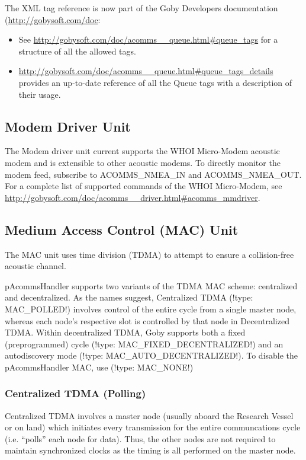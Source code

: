 The XML tag reference is now part of the Goby Developers documentation (\url{http://gobysoft.com/doc}:
\begin{itemize}
\item See \url{http://gobysoft.com/doc/acomms__queue.html#queue_tags} for a structure of all the allowed tags.
\item \url{http://gobysoft.com/doc/acomms__queue.html#queue_tags_details} provides an up-to-date reference of all the Queue tags with a description of their usage.
\end{itemize}  

\subsection{Modem Driver Unit}

The Modem driver unit current supports the WHOI Micro-Modem acoustic modem and is extensible to other acoustic modems. To directly monitor the modem feed, subscribe to ACOMMS\_NMEA\_IN and ACOMMS\_NMEA\_OUT. For a complete list of supported commands of the WHOI Micro-Modem, see \url{http://gobysoft.com/doc/acomms__driver.html#acomms_mmdriver}.

\subsection{Medium Access Control (MAC) Unit}

The MAC unit uses time division (TDMA) to attempt to ensure a collision-free acoustic channel.

pAcommsHandler supports two variants of the TDMA MAC scheme: centralized and decentralized. As the names suggest, Centralized TDMA (!type: MAC_POLLED!) involves control of the entire cycle from a single master node, whereas each node's respective slot is controlled by that node in Decentralized TDMA. Within decentralized TDMA, Goby supports both a fixed (preprogrammed) cycle (!type: MAC_FIXED_DECENTRALIZED!) and an autodiscovery mode (!type: MAC_AUTO_DECENTRALIZED!). To disable the pAcommsHandler MAC, use (!type: MAC_NONE!)

\subsubsection{Centralized TDMA (Polling)}

Centralized TDMA involves a master node (usually aboard the Research Vessel or on land) which initiates every transmission for the entire communcations cycle (i.e. ``polls'' each node for data). Thus, the other nodes are not required to maintain synchronized clocks as the timing is all performed on the master node.

